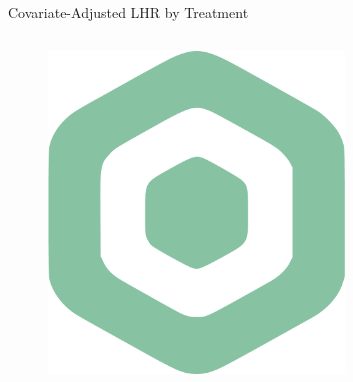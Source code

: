 \documentclass[compress,ignorenonframetext,aspectratio=1610,handout]{beamer}
\begin{document}
\begin{frame}{Covariate-Adjusted LHR by Treatment}
\begin{columns}
		\begin{figure}
			\includegraphics[width=0.7\textwidth]{figs/logos/logo-vectorizado-crop.pdf}	
		\end{figure}

	\end{columns}
\end{frame}
\end{document}
